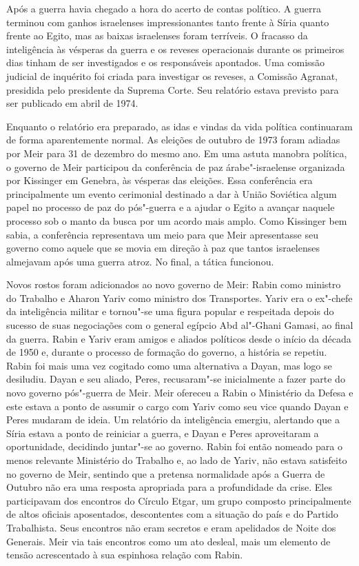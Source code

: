 Após a guerra havia chegado a hora do acerto de contas político. A
guerra terminou com ganhos israelenses impressionantes tanto frente à
Síria quanto frente ao Egito, mas as baixas israelenses foram terríveis.
O fracasso da inteligência às vésperas da guerra e os reveses
operacionais durante os primeiros dias tinham de ser investigados e os
responsáveis apontados. Uma comissão judicial de inquérito foi criada
para investigar os reveses, a Comissão Agranat, presidida pelo
presidente da Suprema Corte. Seu relatório estava previsto para ser
publicado em abril de 1974.

Enquanto o relatório era preparado, as idas e vindas da vida
política continuaram de forma aparentemente normal. As eleições de
outubro de 1973 foram adiadas por Meir para 31 de dezembro do mesmo ano.
Em uma astuta manobra política, o governo de Meir participou da
conferência de paz árabe"-israelense organizada por Kissinger em Genebra,
às vésperas das eleições. Essa conferência era principalmente
um evento cerimonial destinado a dar à União Soviética algum papel no
processo de paz do pós"-guerra e a ajudar o Egito a avançar naquele
processo sob o manto da busca por um acordo mais amplo. Como Kissinger
bem sabia, a conferência representava um meio para que Meir apresentasse
seu governo como aquele que se movia em direção à paz que tantos
israelenses almejavam após uma guerra atroz. No final, a tática
funcionou.

Novos rostos foram adicionados ao novo governo de Meir: Rabin como
ministro do Trabalho e Aharon Yariv como ministro dos Transportes.
Yariv era o ex"-chefe da inteligência militar e tornou"-se uma figura
popular e respeitada depois do sucesso de suas negociações com o general
egípcio Abd al"-Ghani Gamasi, ao final da guerra. Rabin e Yariv eram
amigos e aliados políticos desde o início da década de 1950 e, durante o
processo de formação do governo, a história se repetiu. Rabin foi mais
uma vez cogitado como uma alternativa a Dayan, mas logo se desiludiu.
Dayan e seu aliado, Peres, recusaram"-se inicialmente a fazer parte do
novo governo pós"-guerra de Meir. Meir ofereceu a Rabin o Ministério da
Defesa e este estava a ponto de assumir o cargo com Yariv como seu vice
quando Dayan e Peres mudaram de ideia. Um relatório da inteligência
emergiu, alertando que a Síria estava a ponto de reiniciar a guerra, e
Dayan e Peres aproveitaram a oportunidade, decidindo juntar"-se ao
governo. Rabin foi então nomeado para o menos relevante Ministério do
Trabalho e, ao lado de Yariv, não estava satisfeito no governo de Meir,
sentindo que a pretensa normalidade após a Guerra de Outubro não era uma
resposta apropriada para a profundidade da crise. Eles participavam dos
encontros do Círculo Etgar, um grupo composto principalmente de altos
oficiais aposentados, descontentes com a situação do país e do Partido
Trabalhista. Seus encontros não eram secretos e eram apelidados de Noite
dos Generais. Meir via tais encontros como um ato desleal, mais um
elemento de tensão acrescentado à sua espinhosa relação com Rabin.


